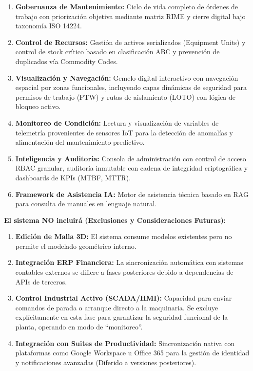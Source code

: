\begin{enumerate}
    \item \textbf{Gobernanza de Mantenimiento:} Ciclo de vida completo de órdenes de trabajo con priorización objetiva mediante matriz RIME y cierre digital bajo taxonomía ISO 14224.
    \item \textbf{Control de Recursos:} Gestión de activos serializados (Equipment Units) y control de stock crítico basado en clasificación ABC y prevención de duplicados vía Commodity Codes.
    \item \textbf{Visualización y Navegación:} Gemelo digital interactivo con navegación espacial por zonas funcionales, incluyendo capas dinámicas de seguridad para permisos de trabajo (PTW) y rutas de aislamiento (LOTO) con lógica de bloqueo activo.
    \item \textbf{Monitoreo de Condición:} Lectura y visualización de variables de telemetría provenientes de sensores IoT para la detección de anomalías y alimentación del mantenimiento predictivo.
    \item \textbf{Inteligencia y Auditoría:} Consola de administración con control de acceso RBAC granular, auditoría inmutable con cadena de integridad criptográfica y dashboards de KPIs (MTBF, MTTR).
    \item \textbf{Framework de Asistencia IA:} Motor de asistencia técnica basado en RAG para consulta de manuales en lenguaje natural.
\end{enumerate}
\textbf{El sistema NO incluirá (Exclusiones y Consideraciones Futuras):}

\begin{enumerate}
    \item \textbf{Edición de Malla 3D:} El sistema consume modelos existentes pero no permite el modelado geométrico interno.
    \item \textbf{Integración ERP Financiera:} La sincronización automática con sistemas contables externos se difiere a fases posteriores debido a dependencias de APIs de terceros.
    \item \textbf{Control Industrial Activo (SCADA/HMI):} Capacidad para enviar comandos de parada o arranque directo a la maquinaria. Se excluye explícitamente en esta fase para garantizar la seguridad funcional de la planta, operando en modo de ``monitoreo''.
    \item \textbf{Integración con Suites de Productividad:} Sincronización nativa con plataformas como Google Workspace u Office 365 para la gestión de identidad y notificaciones avanzadas (Diferido a versiones posteriores).
\end{enumerate}
